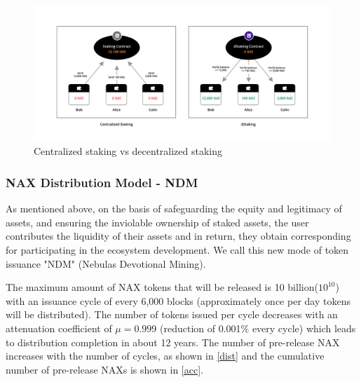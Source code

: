 \begin{figure}[htbp]
  \centering
  \includegraphics[width=1\textwidth]{../common/dStaking.pdf}
  \caption{Centralized staking vs decentralized staking\label{fig:dStaking}}
\end{figure}

\subsubsection{NAX Distribution Model - NDM}
As mentioned above, on the basis of safeguarding the equity and legitimacy of assets, and ensuring the inviolable ownership of staked assets, the user contributes the liquidity of their assets and in return, they obtain corresponding for participating in the ecosystem development. We call this new mode of token issuance "NDM" (Nebulas Devotional Mining). 

The maximum amount of NAX tokens that will be released is 10 billion(\(10^{10}\)) with an issuance cycle of every 6,000 blocks (approximately once per day tokens will be distributed). The number of tokens issued per cycle decreases with an attenuation coefficient of $\mu=0.999$ (reduction of 0.001\% every cycle) which leads to distribution completion in about 12 years. The number of pre-release NAX increases with the number of cycles, as shown in \ref{dist} and the cumulative number of pre-release NAXs is shown in \ref{acc}.


